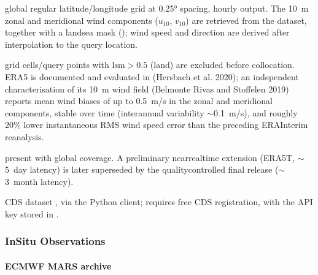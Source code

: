 \documentclass[a4paper,10pt,english]{sphinxmanual}
\begin{document}
\sphinxAtStartPar
{}

\sphinxAtStartPar
global regular latitude/longitude grid at 0.25° spacing, hourly output. The 10 m zonal and meridional wind components (\(u_{10}\), \(v_{10}\)) are retrieved from the  dataset, together with a land\sphinxhyphen{}sea mask (); wind speed and direction are derived after interpolation to the query location.

\sphinxAtStartPar
{}

\sphinxAtStartPar
grid cells/query points with \(\mathrm{lsm} > 0.5\) (land) are excluded before collocation. ERA5 is documented and evaluated in (Hersbach et al. 2020); an independent characterisation of its 10 m wind field (Belmonte Rivas and Stoffelen 2019) reports mean wind biases of up to 0.5 m/s in the zonal and meridional components, stable over time (interannual variability \(\sim\)0.1 m/s), and roughly 20\% lower instantaneous RMS wind speed error than the preceding ERA\sphinxhyphen{}Interim reanalysis.

\sphinxAtStartPar
{}

 \sphinxhyphen{} present with global coverage. A preliminary near\sphinxhyphen{}real\sphinxhyphen{}time extension (ERA5T, \(\sim\)5 day latency) is later superseded by the quality\sphinxhyphen{}controlled final release (\(\sim\)3 month latency).

\sphinxAtStartPar
{}

\sphinxAtStartPar
CDS dataset , via the  Python client; requires free CDS registration, with the API key stored in .


\subsubsection{In\sphinxhyphen{}Situ Observations}
\label{\detokenize{05_reference_datasets:in-situ-observations}}

\paragraph{ECMWF MARS archive}
\label{\detokenize{05_reference_datasets:ecmwf-mars-archive}}
\sphinxAtStartPar
{}
\end{document}
